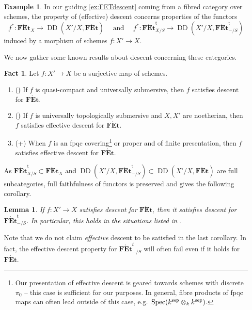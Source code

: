 \documentclass[a4paper,twoside,11pt,reqno]{amsart}
\newcommand{\la}{\longrightarrow}
\DeclareMathOperator{\Spec}{Spec}
\newcommand{\cat}[1]{\mathbf{#1}}
\newcommand{\FEt}{\cat{F\acute{E}t}}
\newcommand{\FEtt}{{\cat{F\acute{E}t}}^{\!\mathrm{t}}}
\DeclareMathOperator{\Desc}{DD}
\newtheorem{lem}[thm]{Lemma}
\theoremstyle{definition}
\newtheorem{ex}[thm]{Example}
\newtheorem{fact}[thm]{Fact}
\numberwithin{equation}{subsection}
\begin{document}
\begin{ex}
In our guiding \cref{ex:FETdescent} coming from a fibred category over schemes, the property of (effective) descent concerns properties of the functors
\begin{equation}
\label{eq:CechDescentSettingForFEt}
    f^\ast \colon \FEt_X \la \Desc(X'/X, \FEt) \quad \textrm{ and } \quad f^\ast \colon \FEtt_{X/S} \la \Desc(X'/X, \FEtt_{-/S})
\end{equation}
induced by a morphism of schemes $f\colon X'\to X$.
\end{ex}
We now gather some known results about descent concerning these categories.
\begin{fact}\label{fact:eff-decent-maps-for-FEt}
    Let $f \colon X' \to X$ be a surjective map of schemes.
\begin{enumerate}
    \item 
    (\cite[IX Corollaire 3.3+Proposition 2.4]{SGA1}) If $f$ is quasi-compact and universally submersive, then $f$ satisfies  descent for $\FEt$.
    \item 
    (\cite[Corollary~5.18]{RydhSubmersions}) If $f$ is  universally topologically submersive and $X, X'$ are noetherian, then $f$ satisfies effective descent for $\FEt$.
    \item 
    (\cite[IX Proposition~4.1]{SGA1}+\cite[IX Th\'eor\`eme~4.12]{SGA1}) When $f$ is an fpqc covering\footnote{Our presentation of effective descent is geared towards schemes with discrete $\pi_0$ -- this case is sufficient for our purposes. In general, fibre products of fpqc maps can often lead outside of this case, e.g.\ $\Spec(k^{\rm sep}\otimes_k k^{\rm sep})$.} or proper and of finite presentation, then $f$ satisfies effective descent for $\FEt$.
\end{enumerate}
\end{fact}
As  $\FEtt_{X/S} \subset \FEt_X$ and $\Desc(X'/X, \FEtt_{-/S}) \subset \Desc(X'/X, \FEt)$ are full subcategories, full faithfulness of functors is preserved and gives the following corollary.
\begin{lem}\label{lem:f-desc-for-FEt-and-FEtt}
    If $f \colon X' \to X$ satisfies descent for $\FEt$, then it satisfies descent for $\FEtt_{-/S}$. In particular, this holds in  the situations listed in .
\end{lem}
Note that we do not claim \emph{effective} descent to be satisfied in the last corollary. In fact, the effective descent property for $\FEt^t_{-/S}$ will often fail even if it holds for $\FEt$.  
\end{document}
